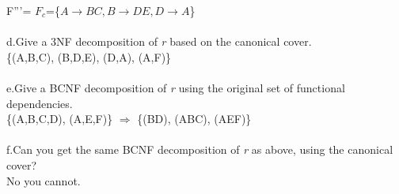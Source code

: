 \documentclass[]{article}
\begin{document}
F'''= $F_c$=\{$A\rightarrow BC, B\rightarrow DE, D \rightarrow A$\}
\\\\
d.\indent Give a 3NF decomposition of \textit{r} based on the canonical cover.\\
\{(A,B,C), (B,D,E), (D,A), (A,F)\}
\\\\
e.\indent Give a BCNF decomposition of \textit{r} using the original set of functional dependencies.\\
\{(A,B,C,D), (A,E,F)\} $\Rightarrow$ \{(BD), (ABC), (AEF)\}
\\\\
f.\indent Can you get the same BCNF decomposition of \textit{r} as above, using the canonical cover?\\
No you cannot.
\end{document}
